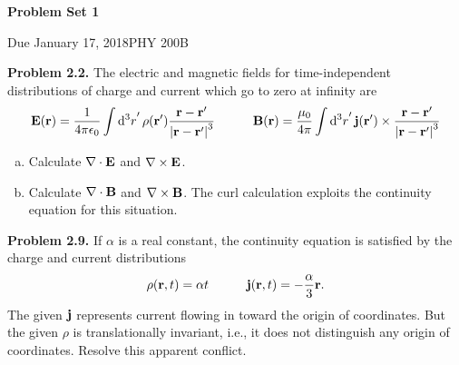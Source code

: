 \documentclass{article}
\newcommand{\Title}     {Problem Set 1}
\newcommand{\DueDate}   {January 17, 2018}
\newcommand{\Course}    {PHY 200B}
\begin{document}
{\huge\bf\Title}

Due \DueDate \hfill \Course




\hrulefill

\textbf{Problem 2.2.} The electric and magnetic fields for time-independent distributions of charge and current which go to zero at infinity are
\begin{equation*}
\begin{aligned}
	\vb{E}(\vb{r}) = \frac{1}{4\pi\epsilon _0}\int\dd[3]{r} '\rho(\vb{r'})\frac{\vb{r}-\vb{r'}}{\left|\vb{r}-\vb{r'}\right|^3} \quad\quad\quad \vb{B}(\vb{r}) = \frac{\mu _0}{4\pi}\int\dd[3]{r} '\vb{j}(\vb{r'})\times\frac{\vb{r}-\vb{r'}}{\left|\vb{r}-\vb{r'}\right|^3}
\end{aligned}
\end{equation*}
\begin{enumerate}[(a)]
\item Calculate $\nabla\cdot\vb{E}$ and $\nabla\times\vb{E}$.
\item Calculate $\nabla\cdot\vb{B}$ and $\nabla\times\vb{B}$. The curl calculation exploits the continuity equation for this situation.
\end{enumerate}	

\hrulefill

\textbf{Problem 2.9.} If $\alpha$ is a real constant, the continuity equation is satisfied by the charge and current distributions
\begin{equation*}
\begin{aligned}
	\rho (\vb{r},t) = \alpha t \quad\quad\quad \vb{j}(\vb{r},t) = -\frac{\alpha}{3}\vb{r}.
\end{aligned}
\end{equation*}
The given $\vb{j}$ represents current flowing in toward the origin of coordinates. But the given $\rho$ is translationally invariant, i.e., it does not distinguish any origin of coordinates. Resolve this apparent conflict.
\end{document}
